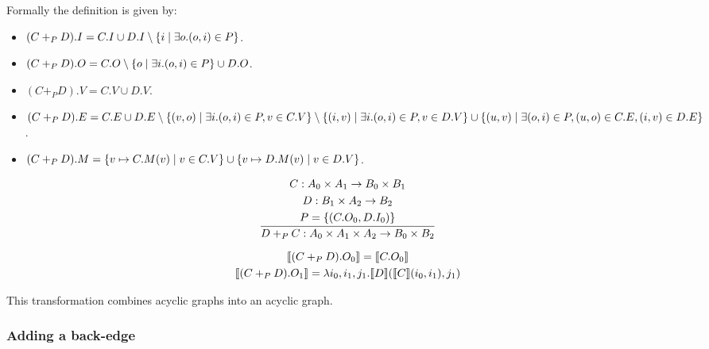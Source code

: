 Formally the definition is given by:

\begin{itemize}
\item $(C+_P D).I = C.I \cup D.I \setminus \{ i \;|\; \exists o . (o, i) \in P \}$.
\item $(C+_P D).O = C.O \setminus \{ o \;|\; \exists i . (o, i) \in P \} \cup D.O$.
\item $(C+_P D).V = C.V \cup D.V$.
\item $(C+_P D).E = C.E \cup D.E \setminus \{ (v, o) \;|\; \exists i . (o, i) \in P, v \in C.V \} \\ \setminus 
\{ (i, v) \;|\; \exists i. (o, i) \in P, v \in D.V \} \cup \{ (u, v) \;|\; \exists (o,i) \in P, (u,o) \in C.E, (i, v) \in D.E \}$.
\item $(C+_P D).M = \{ v \mapsto C.M(v) \;|\; v \in C.V \} \cup \{ v \mapsto D.M(v) \;|\; v \in D.V \}$.
\end{itemize}

$$\frac{
\begin{gathered}
    C: A_0 \times A_1 \rightarrow B_0 \times B_1 \\
    D: B_1 \times A_2 \rightarrow B_2 \\
    P = \{ (C.O_0, D.I_0) \} \\
\end{gathered}
}{
D +_P C: A_0 \times A_1 \times A_2 \rightarrow B_0 \times B_2
}
$$

$$
\begin{gathered}
\llbracket (C +_P D).O_0 \rrbracket = \llbracket C.O_0 \rrbracket \\
\llbracket (C +_P D).O_1 \rrbracket = \lambda i_0, i_1, j_1 . \llbracket D \rrbracket(\llbracket C \rrbracket(i_0, i_1), j_1) 
\end{gathered}
$$

\begin{comment}
The ``parallel'' composition of two circuits is just a special case
of the sequential composition where the set of edge pairs connected is empty $P = \phi$.
However, when circuits are connected in parallel we still require that all inputs
and outputs of $C$ and $D$ to be in the same clock domain.  When $P \not= \phi$ this
is ensured by the typing rules.
\end{comment}

This transformation combines acyclic graphs into an acyclic graph.

\subsubsection{Adding a back-edge}

